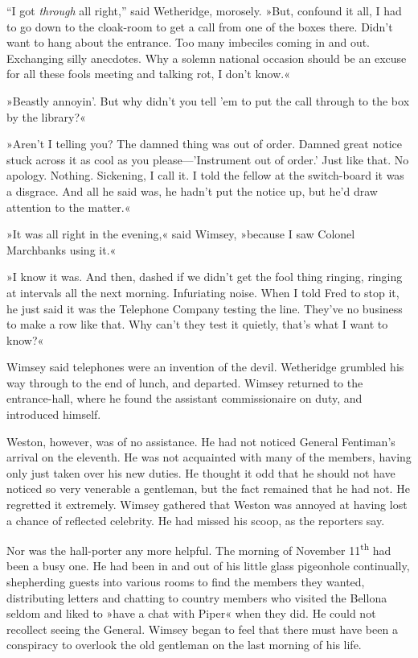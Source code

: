 \enquote{I got \textit{through} all right,} said Wetheridge, morosely. »But, confound it all, I had to go down to the cloak-room to get a call from one of the boxes there. Didn't want to hang about the entrance. Too many imbeciles coming in and out. Exchanging silly anecdotes. Why a solemn national occasion should be an excuse for all these fools meeting and talking rot, I don't know.«

»Beastly annoyin'. But why didn't you tell 'em to put the call through to the box by the library?«

»Aren't I telling you? The damned thing was out of order. Damned great notice stuck across it as cool as you please---'Instrument out of order.' Just like that. No apology. Nothing. Sickening, I call it. I told the fellow at the switch-board it was a disgrace. And all he said was, he hadn't put the notice up, but he'd draw attention to the matter.«

»It was all right in the evening,« said Wimsey, »because I saw Colonel Marchbanks using it.«

»I know it was. And then, dashed if we didn't get the fool thing ringing, ringing at intervals all the next morning. Infuriating noise. When I told Fred to stop it, he just said it was the Telephone Company testing the line. They've no business to make a row like that. Why can't they test it quietly, that's what I want to know?«

Wimsey said telephones were an invention of the devil. Wetheridge grumbled his way through to the end of lunch, and departed. Wimsey returned to the entrance-hall, where he found the assistant commissionaire on duty, and introduced himself.

Weston, however, was of no assistance. He had not noticed General Fentiman's arrival on the eleventh. He was not acquainted with many of the members, having only just taken over his new duties. He thought it odd that he should not have noticed so very venerable a gentleman, but the fact remained that he had not. He regretted it extremely. Wimsey gathered that Weston was annoyed at having lost a chance of reflected celebrity. He had missed his scoop, as the reporters say.

Nor was the hall-porter any more helpful. The morning of November  11\textsuperscript{th} had been a busy one. He had been in and out of his little glass pigeonhole continually, shepherding guests into various rooms to find the members they wanted, distributing letters and chatting to country members who visited the Bellona seldom and liked to »have a chat with Piper« when they did. He could not recollect seeing the General. Wimsey began to feel that there must have been a conspiracy to overlook the old gentleman on the last morning of his life.

